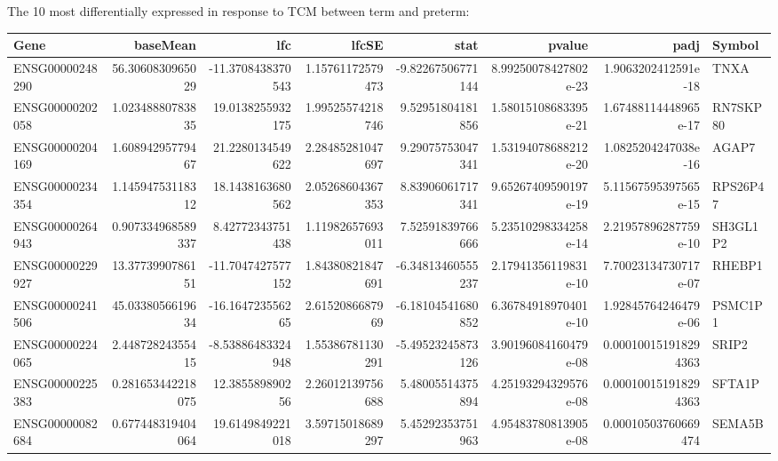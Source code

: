 The 10 most differentially expressed in response to TCM between term and preterm:
\begin{center}
\begin{tabular}{lrrrrrrl}
Gene & baseMean & lfc & lfcSE & stat & pvalue & padj & Symbol\\
\hline
ENSG00000248290 & 56.3060830965029 & -11.3708438370543 & 1.15761172579473 & -9.82267506771144 & 8.99250078427802e-23 & 1.9063202412591e-18 & TNXA\\
ENSG00000202058 & 1.02348880783835 & 19.0138255932175 & 1.99525574218746 & 9.52951804181856 & 1.58015108683395e-21 & 1.67488114448965e-17 & RN7SKP80\\
ENSG00000204169 & 1.60894295779467 & 21.2280134549622 & 2.28485281047697 & 9.29075753047341 & 1.53194078688212e-20 & 1.0825204247038e-16 & AGAP7\\
ENSG00000234354 & 1.14594753118312 & 18.1438163680562 & 2.05268604367353 & 8.83906061717341 & 9.65267409590197e-19 & 5.11567595397565e-15 & RPS26P47\\
ENSG00000264943 & 0.907334968589337 & 8.42772343751438 & 1.11982657693011 & 7.52591839766666 & 5.23510298334258e-14 & 2.21957896287759e-10 & SH3GL1P2\\
ENSG00000229927 & 13.3773990786151 & -11.7047427577152 & 1.84380821847691 & -6.34813460555237 & 2.17941356119831e-10 & 7.70023134730717e-07 & RHEBP1\\
ENSG00000241506 & 45.0338056619634 & -16.164723556265 & 2.6152086687969 & -6.18104541680852 & 6.36784918970401e-10 & 1.92845764246479e-06 & PSMC1P1\\
ENSG00000224065 & 2.44872824355415 & -8.53886483324948 & 1.55386781130291 & -5.49523245873126 & 3.90196084160479e-08 & 0.000100151918294363 & SRIP2\\
ENSG00000225383 & 0.281653442218075 & 12.385589890256 & 2.26012139756688 & 5.48005514375894 & 4.25193294329576e-08 & 0.000100151918294363 & SFTA1P\\
ENSG00000082684 & 0.677448319404064 & 19.6149849221018 & 3.59715018689297 & 5.45292353751963 & 4.95483780813905e-08 & 0.00010503760669474 & SEMA5B\\
\end{tabular}
\end{center}


